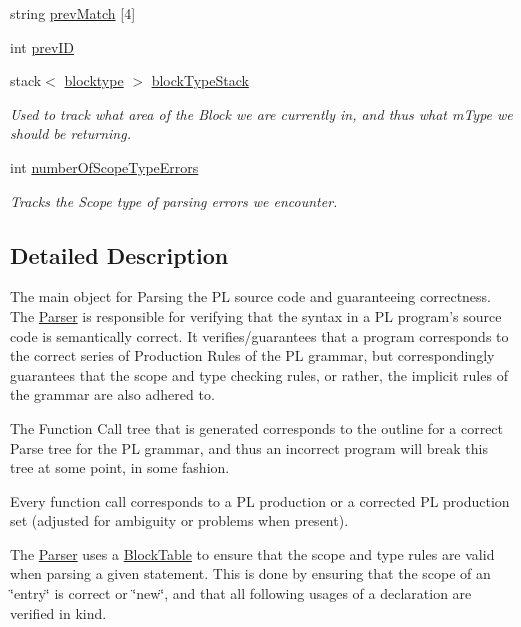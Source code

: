 \begin{DoxyCompactItemize}
string \hyperlink{classParser_aeee13154ac5d45a615a57fd4d982487b}{prevMatch} \mbox{[}4\mbox{]}
\item 
int \hyperlink{classParser_a4068ed26fd5e4ea914a05979ba4d792c}{prevID}
\item 
stack$<$ \hyperlink{parser_8h_a84146e06b05135ce314ab9e853e43d8c}{blocktype} $>$ \hyperlink{classParser_ae9c8fcaf225a1d019fc1e87ee330605c}{blockTypeStack}
\begin{DoxyCompactList}\small\item\em Used to track what area of the Block we are currently in, and thus what mType we should be returning. \item\end{DoxyCompactList}\item 
int \hyperlink{classParser_a43e9e43e927c28bc883fd7ff20d165a1}{numberOfScopeTypeErrors}
\begin{DoxyCompactList}\small\item\em Tracks the Scope type of parsing errors we encounter. \item\end{DoxyCompactList}\end{DoxyCompactItemize}


\subsection{Detailed Description}
The main object for Parsing the PL source code and guaranteeing correctness. The \hyperlink{classParser}{Parser} is responsible for verifying that the syntax in a PL program's source code is semantically correct. It verifies/guarantees that a program corresponds to the correct series of Production Rules of the PL grammar, but correspondingly guarantees that the scope and type checking rules, or rather, the implicit rules of the grammar are also adhered to.

The Function Call tree that is generated corresponds to the outline for a correct Parse tree for the PL grammar, and thus an incorrect program will break this tree at some point, in some fashion.

Every function call corresponds to a PL production or a corrected PL production set (adjusted for ambiguity or problems when present).

The \hyperlink{classParser}{Parser} uses a \hyperlink{classBlockTable}{BlockTable} to ensure that the scope and type rules are valid when parsing a given statement. This is done by ensuring that the scope of an \char`\"{}entry\char`\"{} is correct or \char`\"{}new\char`\"{}, and that all following usages of a declaration are verified in kind. 

